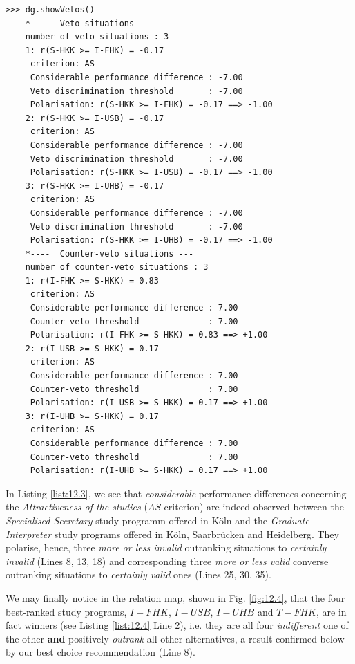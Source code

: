 \begin{lstlisting}[caption={Polarised outranking situations},label=list:12.3]
>>> dg.showVetos()
    *----  Veto situations ---
    number of veto situations : 3 
    1: r(S-HKK >= I-FHK) = -0.17
     criterion: AS
     Considerable performance difference : -7.00
     Veto discrimination threshold       : -7.00
     Polarisation: r(S-HKK >= I-FHK) = -0.17 ==> -1.00
    2: r(S-HKK >= I-USB) = -0.17
     criterion: AS
     Considerable performance difference : -7.00
     Veto discrimination threshold       : -7.00
     Polarisation: r(S-HKK >= I-USB) = -0.17 ==> -1.00
    3: r(S-HKK >= I-UHB) = -0.17
     criterion: AS
     Considerable performance difference : -7.00
     Veto discrimination threshold       : -7.00
     Polarisation: r(S-HKK >= I-UHB) = -0.17 ==> -1.00
    *----  Counter-veto situations ---
    number of counter-veto situations : 3 
    1: r(I-FHK >= S-HKK) = 0.83
     criterion: AS
     Considerable performance difference : 7.00
     Counter-veto threshold              : 7.00
     Polarisation: r(I-FHK >= S-HKK) = 0.83 ==> +1.00
    2: r(I-USB >= S-HKK) = 0.17
     criterion: AS
     Considerable performance difference : 7.00
     Counter-veto threshold              : 7.00
     Polarisation: r(I-USB >= S-HKK) = 0.17 ==> +1.00
    3: r(I-UHB >= S-HKK) = 0.17
     criterion: AS
     Considerable performance difference : 7.00
     Counter-veto threshold              : 7.00
     Polarisation: r(I-UHB >= S-HKK) = 0.17 ==> +1.00
\end{lstlisting}

In Listing \ref{list:12.3}, we see that \emph{considerable} performance differences concerning the \emph{Attractiveness of the studies} ($AS$ criterion) are indeed observed between the \emph{Specialised Secretary} study programm offered in Köln and the \emph{Graduate Interpreter} study programs offered in Köln, Saarbrücken and Heidelberg. They polarise, hence, three \emph{more or less invalid} outranking situations to \emph{certainly invalid} (Lines 8, 13, 18) and corresponding three \emph{more or less valid} converse outranking situations to \emph{certainly valid} ones (Lines 25, 30, 35). 

We may finally notice in the relation map, shown in Fig. \ref{fig:12.4}, that the four best-ranked study programs, $I-FHK$, $I-USB$, $I-UHB$ and $T-FHK$,  are in fact \Condorcet winners (see Listing \ref{list:12.4} Line 2), i.e. they are all four \emph{indifferent} one of the other \textbf{and} positively \emph{outrank} all other alternatives, a result confirmed below by our best choice recommendation (Line 8).
   
